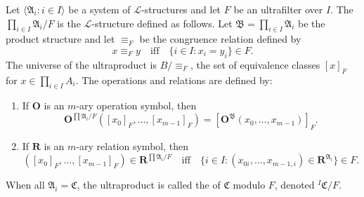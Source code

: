 Let $\langle \mathfrak{A}_i : i \in I \rangle$ be a system of $\mathcal{L}$-structures and let $F$ be an ultrafilter over $I$. The  $\prod_{i \in I} \mathfrak{A}_i / F$ is the $\mathcal{L}$-structure defined as follows. Let $\mathfrak{B} = \prod_{i \in I} \mathfrak{A}_i$ be the product structure and let $\equiv_F$ be the congruence relation defined by
$$x \equiv_F y \quad \text{iff} \quad \{i \in I : x_i = y_i\} \in F.$$
The universe of the ultraproduct is $B/{\equiv_F}$, the set of equivalence classes $[x]_F$ for $x \in \prod_{i \in I} A_i$. The operations and relations are defined by:

\begin{enumerate}
\item[(i)] If $\mathbf{O}$ is an $m$-ary operation symbol, then
$$\mathbf{O}^{\prod \mathfrak{A}_i/F}([x_0]_F, \ldots, [x_{m-1}]_F) = [\mathbf{O}^{\mathfrak{B}}(x_0, \ldots, x_{m-1})]_F.$$

\item[(ii)] If $\mathbf{R}$ is an $m$-ary relation symbol, then
$$([x_0]_F, \ldots, [x_{m-1}]_F) \in \mathbf{R}^{\prod \mathfrak{A}_i/F} \quad \text{iff} \quad \{i \in I : (x_{0i}, \ldots, x_{m-1,i}) \in \mathbf{R}^{\mathfrak{A}_i}\} \in F.$$
\end{enumerate}

When all $\mathfrak{A}_i = \mathfrak{C}$, the ultraproduct is called the  of $\mathfrak{C}$ modulo $F$, denoted ${}^I\mathfrak{C}/F$.
